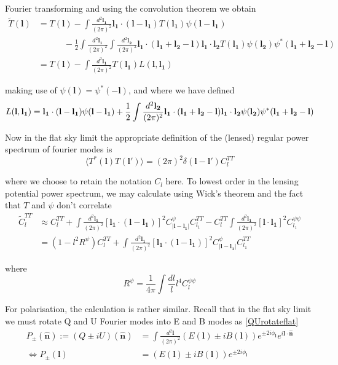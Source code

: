 \documentclass[a4paper,10pt]{article}
\renewcommand{\v}[1]{\mathbf{#1}}
\newcommand{\half}{\frac{1}{2}}
\newcommand{\finttwo}[1]{\int \frac{d^2 \v{#1}}{(2\pi)^2}}
\newcommand{\unit}[1]{\hat{\v{#1}}}
\begin{document}
Fourier transforming and using the convolution theorem we obtain
\begin{equation}\begin{split}
\tilde{T}(\v{l}) &= T(\v{l}) - \finttwo{l_1} \v{l_1}\cdot(\v{l}-\v{l_1})T(\v{l_1})\psi(\v{l}-\v{l_1}) \\
& \qquad \quad -\half \finttwo{l_1}\finttwo{l_2}\v{l_1}\cdot(\v{l_1}+\v{l_2}-\v{l})\v{l_1}\cdot\v{l_2}T(\v{l_1})\psi(\v{l_2})\psi^*(\v{l_1}+\v{l_2}-\v{l})\\
&= T(\v{l}) - \finttwo{l_1} T(\v{l_1})L(\v{l},\v{l_1})
\label{lensedtemp}
\end{split}\end{equation}

making use of $\psi(\v{l})=\psi^*(-\v{l})$, and where we have defined 
\begin{equation}
L(\v{l},\v{l_1}) = \v{l_1}\cdot(\v{l}-\v{l_1})\psi(\v{l}-\v{l_1})+\half\finttwo{l_2}\v{l_1}\cdot(\v{l_1}+\v{l_2}-\v{l})\v{l_1}\cdot\v{l_2}\psi(\v{l_2})\psi^*(\v{l_1}+\v{l_2}-\v{l})\\
\end{equation}

Now in the flat sky limit the appropriate definition of the (lensed) regular power spectrum of fourier modes is
\begin{equation}
\langle T^*(\v{l})T(\v{l}')\rangle = (2\pi)^2\delta(\v{l}-\v{l}')C_l^{TT}
\end{equation}

where we choose to retain the notation $C_l$ here. To lowest order in the lensing potential power spectrum, we may calculate using Wick's theorem and the fact that $T$ and $\psi$ don't correlate
\begin{equation}\begin{split}
\tilde{C}_l^{T T} &\approx C_l^{T T}+\finttwo{l_1}[ \v{l_1}\cdot(\v{l}-\v{l_1})]^2 C^\psi_{|\v{l}-\v{l_1}|}C_{l_1}^{TT} - C_l^{TT}\finttwo{l_1} [\v{l}\cdot\v{l_1}]^2C_{l_1}^{\psi\psi}\\
&=(1-l^2R^\psi)C_l^{TT}+\finttwo{l_1}[ \v{l_1}\cdot(\v{l}-\v{l_1})]^2 C^{\psi}_{|\v{l}-\v{l_1}|}C_{l_1}^{TT}
\end{split}\end{equation}

where
\begin{equation}
R^\psi = \frac{1}{4\pi}\int \frac{dl}{l} l^4 C_l^{\psi\psi}
\end{equation}

For polarisation, the calculation is rather similar. Recall that in the flat sky limit we must rotate Q and U Fourier modes into E and B modes as \ref{QUrotateflat}
\begin{equation}\begin{split}
 P_{\pm} (\unit{n}) := (Q\pm iU)(\unit{n})  &= \finttwo{l}(E(\v{l})\pm i B(\v{l}))e^{\pm 2i\phi_{\v{l}}}e^{i\v{l}\cdot\unit{n}}\\
\Leftrightarrow  P_{\pm}(\v{l}) &= (E(\v{l})\pm i B(\v{l}))e^{\pm 2i\phi_{\v{l}}}
\label{relationship}
\end{split}\end{equation}
\end{document}
